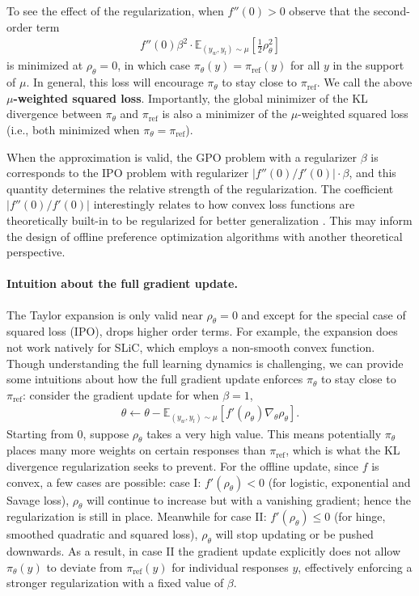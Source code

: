 To see the effect of the regularization, when $f''(0)>0$ observe that the second-order term 
\begin{align}
    f''(0)\beta^2\cdot \mathbb{E}_{(y_w,y_l)\sim \mu}\left[\frac{1}{2}\rho_\theta^2\right]\label{eq:squared-regularization}
\end{align}
is minimized at $\rho_\theta=0$, in which case $\pi_\theta(y)=\pi_\text{ref}(y)$ for all $y$ in the support of $\mu$. In general, this loss will encourage $\pi_\theta$ to stay close to $\pi_\text{ref}$. We call the above \textbf{$\mu$-weighted squared loss}. Importantly, the global minimizer of the KL divergence between $\pi_\theta$ and $\pi_\text{ref}$ is also a minimizer of the $\mu$-weighted squared loss (i.e., both minimized when $\pi_\theta=\pi_\text{ref}$).

When the approximation is valid, the GPO problem with a regularizer $\beta$ is corresponds to the IPO problem with regularizer $|f''(0)/f'(0)|\cdot\beta$,
and this quantity determines the relative strength of the regularization.
The coefficient $|f''(0)/f'(0)|$ interestingly relates to how convex loss functions are theoretically built-in to be regularized for better generalization \citep{masnadi2015view}. This may inform the design of offline preference optimization algorithms with another theoretical perspective.

\paragraph{Intuition about the full gradient update.} The Taylor expansion is only valid near $\rho_\theta=0$ and except for the special case of squared loss (IPO), drops higher order terms. For example, the expansion does not work natively for SLiC, which employs a non-smooth convex function. Though understanding the full learning dynamics is challenging, we can provide some intuitions about how the full gradient update enforces $\pi_\theta$ to stay close to $\pi_\text{ref}$: consider the gradient update for when $\beta=1$,
\begin{align}
    \theta \leftarrow \theta - \mathbb{E}_{(y_w,y_l)\sim\mu}\left[f'(\rho_\theta)\nabla_\theta \rho_\theta\right].\label{eq:gradient-update}
\end{align}
Starting from $0$, suppose $\rho_\theta$ takes a very high value. This means potentially $\pi_\theta$ places many more weights on certain responses than $\pi_\text{ref}$, which is what the KL divergence regularization seeks to prevent. For the offline update, since $f$ is convex, a few cases are possible: case I: $f'(\rho_\theta)<0$ (for logistic, exponential and Savage loss), $\rho_\theta$ will continue to increase but with a vanishing gradient; hence the regularization is still in place. Meanwhile for case II: $f'(\rho_\theta)\leq 0$ (for hinge, smoothed quadratic and squared loss), $\rho_\theta$ will stop updating or be pushed downwards. As a result, in case  II the gradient update explicitly does not allow $\pi_\theta(y)$ to deviate from $\pi_\text{ref}(y)$ for individual responses $y$, effectively enforcing a stronger regularization with a fixed value of $\beta$.

